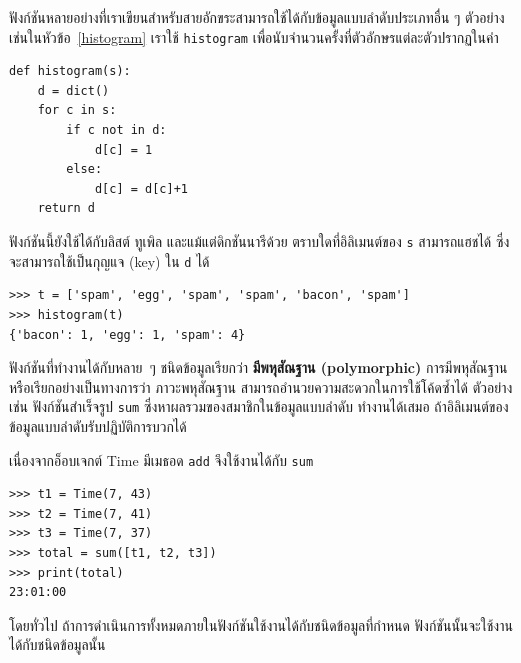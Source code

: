 ฟังก์ชันหลายอย่างที่เราเขียนสำหรับสายอักขระสามารถใช้ได้กับข้อมูลแบบลำดับประเภทอื่น ๆ 
ตัวอย่างเช่นในหัวข้อ~\ref{histogram} เราใช้ {\tt histogram} เพื่อนับจำนวนครั้งที่ตัวอักษรแต่ละตัวปรากฏในคำ


\begin{verbatim}
def histogram(s):
    d = dict()
    for c in s:
        if c not in d:
            d[c] = 1
        else:
            d[c] = d[c]+1
    return d
\end{verbatim}
%

ฟังก์ชันนี้ยังใช้ได้กับลิสต์ ทูเพิล และแม้แต่ดิกชันนารีด้วย ตราบใดที่อิลิเมนต์ของ {\tt s} สามารถแฮชได้ ซึ่งจะสามารถใช้เป็นกุญแจ (key) ใน {\tt d} ได้

\begin{verbatim}
>>> t = ['spam', 'egg', 'spam', 'spam', 'bacon', 'spam']
>>> histogram(t)
{'bacon': 1, 'egg': 1, 'spam': 4}
\end{verbatim}
%

ฟังก์ชันที่ทำงานได้กับหลาย~ๆ ชนิดข้อมูลเรียกว่า {\bf มีพหุสัณฐาน (polymorphic)} 
การมีพหุสัณฐาน หรือเรียกอย่างเป็นทางการว่า ภาวะพหุสัณฐาน
สามารถอำนวยความสะดวกในการใช้โค้ดซ้ำได้ 
ตัวอย่างเช่น ฟังก์ชันสำเร็จรูป \texttt{sum} ซึ่งหาผลรวมของสมาชิกในข้อมูลแบบลำดับ ทำงานได้เสมอ ถ้าอิลิเมนต์ของข้อมูลแบบลำดับรับปฏิบัติการบวกได้


เนื่องจากอ็อบเจกต์ Time มีเมธอด {\tt add} จึงใช้งานได้กับ {\tt sum}

\begin{verbatim}
>>> t1 = Time(7, 43)
>>> t2 = Time(7, 41)
>>> t3 = Time(7, 37)
>>> total = sum([t1, t2, t3])
>>> print(total)
23:01:00
\end{verbatim}
%

โดยทั่วไป ถ้าการดำเนินการทั้งหมดภายในฟังก์ชันใช้งานได้กับชนิดข้อมูลที่กำหนด ฟังก์ชันนั้นจะใช้งานได้กับชนิดข้อมูลนั้น


